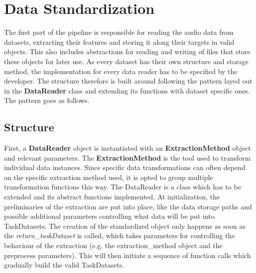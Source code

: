 \section{Data Standardization} \label{Impl:DataRead}


The first part of the pipeline is responsible for reading the audio data from datasets, extracting their features and storing it along their targets in valid objects. This also includes abstractions for reading and writing of files that store these objects for later use. As every dataset has their own structure and storage method, the implementation for every data reader has to be specified by the developer. The structure therefore is built around following the pattern layed out in the \textbf{DataReader} class and extending its functions with dataset specific ones. The pattern goes as follows. \\

\subsection{Structure} \label{Impl:DataRead:Structure}

First, a \textbf{DataReader} object is instantiated with an \textbf{ExtractionMethod} object and relevant parameters. The \textbf{ExtractionMethod} is the tool used to transform individual data instances. Since specific data transformations can often depend on the specific extraction method used, it is opted to group multiple transformation functions this way. The DataReader is a class which has to be extended and its abstract functions implemented. At initialization, the preliminaries of the extraction are put into place, like the data storage paths and possible additional parameters controlling what data will be put into TaskDatasets. The creation of the standardized object only happens as soon as the \textit{return\_taskDataset} is called, which takes parameters for controlling the behaviour of the extraction (e.g. the extraction\_method object and the preprocess parameters). This will then initiate a sequence of function calls which gradually build the valid TaskDatasets.\\

